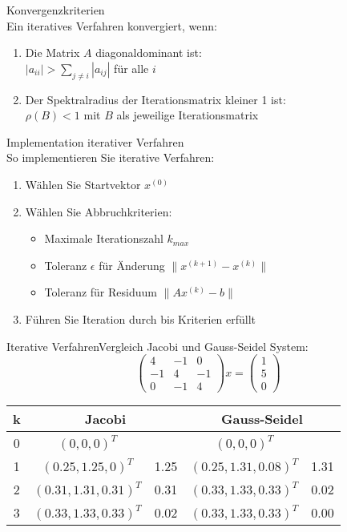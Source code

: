 \begin{theorem}{Konvergenzkriterien}\\
Ein iteratives Verfahren konvergiert, wenn:
\begin{enumerate}
    \item Die Matrix $A$ diagonaldominant ist:\\
    $|a_{ii}| > \sum_{j\neq i} |a_{ij}|$ für alle $i$
    \item Der Spektralradius der Iterationsmatrix kleiner 1 ist:\\
    $\rho(B) < 1$ mit $B$ als jeweilige Iterationsmatrix
\end{enumerate}
\end{theorem}

\begin{KR}{Implementation iterativer Verfahren}\\
So implementieren Sie iterative Verfahren:
\begin{enumerate}
    \item Wählen Sie Startvektor $x^{(0)}$
    \item Wählen Sie Abbruchkriterien:
        \begin{itemize}
            \item Maximale Iterationszahl $k_{max}$
            \item Toleranz $\epsilon$ für Änderung $\|x^{(k+1)} - x^{(k)}\|$
            \item Toleranz für Residuum $\|Ax^{(k)} - b\|$
        \end{itemize}
    \item Führen Sie Iteration durch bis Kriterien erfüllt
\end{enumerate}
\end{KR}

\begin{example2}{Iterative Verfahren}{Vergleich Jacobi und Gauss-Seidel}
System:
$$\begin{pmatrix}
4 & -1 & 0\\
-1 & 4 & -1\\
0 & -1 & 4
\end{pmatrix}x = \begin{pmatrix}
1\\
5\\
0
\end{pmatrix}$$

\begin{center}
\begin{tabular}{c|cc|cc}
k & \multicolumn{2}{c|}{Jacobi} & \multicolumn{2}{c}{Gauss-Seidel}\\
\hline
0 & $(0,0,0)^T$ & & $(0,0,0)^T$ &\\
1 & $(0.25,1.25,0)^T$ & 1.25 & $(0.25,1.31,0.08)^T$ & 1.31\\
2 & $(0.31,1.31,0.31)^T$ & 0.31 & $(0.33,1.33,0.33)^T$ & 0.02\\
3 & $(0.33,1.33,0.33)^T$ & 0.02 & $(0.33,1.33,0.33)^T$ & 0.00
\end{tabular}
\end{center}
\end{example2}


